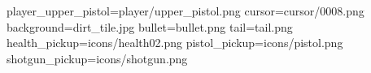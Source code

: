 player_upper_pistol=player/upper_pistol.png
cursor=cursor/0008.png
background=dirt_tile.jpg
bullet=bullet.png
tail=tail.png
health_pickup=icons/health02.png
pistol_pickup=icons/pistol.png
shotgun_pickup=icons/shotgun.png
